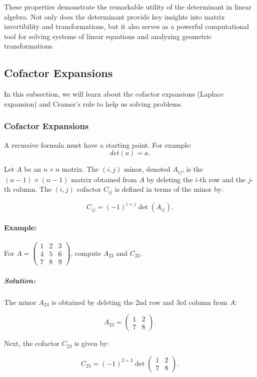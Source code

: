 \documentclass[a4paper,12pt]{article}
\begin{document}
These properties demonstrate the remarkable utility of the determinant in linear algebra. Not only does the determinant provide key insights into matrix invertibility and transformations, but it also serves as a powerful computational tool for solving systems of linear equations and analyzing geometric transformations.

\subsection{Cofactor Expansions}
In this subsection, we will learn about the cofactor expansions (Laplace expansion) and Cramer's rule to help us solving problems.
\subsubsection{Cofactor Expansions}A recursive formula must have a starting point. For example:
\[
det(a) = a.
\]

\begin{tcolorbox}[title=Definition,colframe=blue!70!black, colback=blue!5!white]
Let \( A \) be an \( n \times n \) matrix. The \( (i,j) \) minor, denoted \( A_{ij} \), is the \( (n-1) \times (n-1) \) matrix obtained from \( A \) by deleting the \( i \)-th row and the \( j \)-th column. The \( (i,j) \) cofactor \( C_{ij} \) is defined in terms of the minor by:

\[
C_{ij} = (-1)^{i+j} \det(A_{ij}).
\]
\end{tcolorbox}

\paragraph{Example:}For \( A = \begin{pmatrix} 1 & 2 & 3 \\ 4 & 5 & 6 \\ 7 & 8 & 9 \end{pmatrix} \), compute \( A_{23} \) and \( C_{23} \).
\subparagraph{Solution:}The minor \( A_{23} \) is obtained by deleting the 2nd row and 3rd column from \( A \):

\[
A_{23} = \begin{pmatrix} 1 & 2 \\ 7 & 8 \end{pmatrix}.
\]

Next, the cofactor \( C_{23} \) is given by:

\[
C_{23} = (-1)^{2+3} \det \begin{pmatrix} 1 & 2 \\ 7 & 8 \end{pmatrix}.
\]
\end{document}
